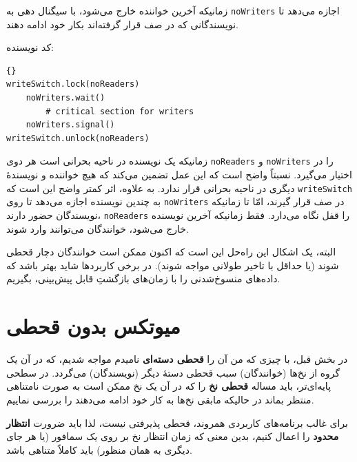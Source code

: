 \documentclass{book}
\newcommand{\clearemptydoublepage}{}%
\begin{document}
    زمانیکه آخرین خواننده خارج می‌شود، با سیگنال دهی به {\tt noWriters} اجازه می‌دهد تا نویسندگانی که در صف قرار گرفته‌اند بکار خود ادامه دهند. 

    کد نویسنده: 

\begin{latin}
\begin{lstlisting}[title=\rl{راه‌حل نویسنده با اولویت نویسنده}]{}
writeSwitch.lock(noReaders)
    noWriters.wait()
        # critical section for writers
    noWriters.signal()
writeSwitch.unlock(noReaders)
\end{lstlisting}
\end{latin}

    زمانیکه یک نویسنده در ناحیه بحرانی است هر دوی {\tt noReaders} و {\tt noWriters} را در اختیار می‌گیرد. 
    نسبتاً واضح است که این عمل تضمین می‌کند که هیچ خواننده و نویسندهٔ دیگری در ناحیه بحرانی قرار ندارد. 
    به علاوه، اثر کمتر واضح این است که {\tt writeSwitch} به چندین نویسنده اجازه می‌دهد تا روی {\tt noWriters} در صف قرار گیرند،‌ 
    امّا تا زمانیکه نویسندگان حضور دارند،   {\tt noReaders} را قفل نگاه می‌دارد. 
    فقط زمانیکه آخرین نویسنده خارج می‌شود، خوانندگان می‌توانند وارد شوند.
    
    البته، یک اشکال این راه‌حل این است که اکنون ممکن است خوانندگان دچار قحطی شوند (یا حداقل با تاخیر طولانی مواجه شوند).  
    در برخی کاربردها شاید بهتر باشد که داده‌های منسوخ‌شدنی را با زمان‌های بازگشتِ قابل پیش‌بینی، بگیریم. 


\clearemptydoublepage
\section{میوتکس بدون قحطی}
\label{props}

    در بخش قبل، با چیزی که من آن را \textbf{قحطی دسته‌ای} نامیدم مواجه شدیم، که در آن یک گروه از نخ‌ها (خوانندگان) 
    سبب قحطی دستهٔ دیگر (نویسندگان) می‌گردد. در سطحی پایه‌ای‌تر،‌ باید مساله \textbf{قحطی نخ} را که در آن یک نخ ممکن است به صورت نامتناهی منتظر بماند در حالیکه مابقی نخ‌ها به کار خود ادامه می‌دهند را بررسی نماییم.
    
    
    برای غالب برنامه‌های کاربردی همروند، قحطی پذیرفتی نیست، لذا باید ضرورت \textbf{انتظار محدود}
    را اعمال کنیم، بدین معنی که زمان انتظار نخ بر روی یک سمافور (یا هر جای دیگری به همان منظور) باید کاملاً متناهی باشد. 
\end{document}
